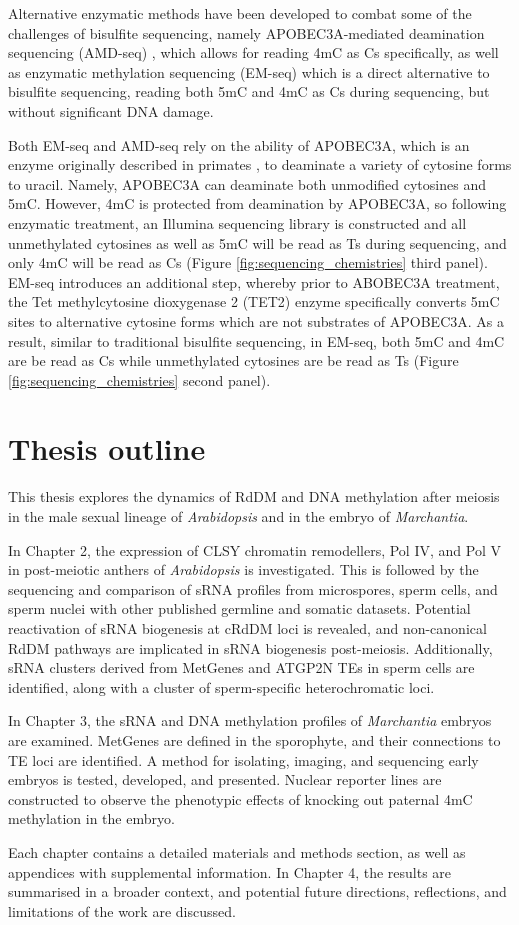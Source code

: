 Alternative enzymatic methods have been developed to combat some of the challenges of bisulfite sequencing, namely APOBEC3A-mediated deamination sequencing (AMD-seq) \cite{RN188}, which allows for reading 4mC as Cs specifically, as well as enzymatic methylation sequencing \cite{RN319} (EM-seq) which is a direct alternative to bisulfite sequencing, reading both 5mC and 4mC as Cs during sequencing, but without significant DNA damage.

Both EM-seq and AMD-seq rely on the ability of APOBEC3A, which is an enzyme originally described in primates \cite{RN320}, to deaminate a variety of cytosine forms to uracil. Namely, APOBEC3A can deaminate both unmodified cytosines and 5mC. However, 4mC is protected from deamination by APOBEC3A, so following enzymatic treatment, an Illumina sequencing library is constructed and all unmethylated cytosines as well as 5mC will be read as Ts during sequencing, and only 4mC will be read as Cs \cite{RN188} (Figure \ref{fig:sequencing_chemistries} third panel). EM-seq introduces an additional step, whereby prior to ABOBEC3A treatment, the Tet methylcytosine dioxygenase 2 (TET2) enzyme specifically converts 5mC sites to alternative cytosine forms which are not substrates of APOBEC3A. As a result, similar to traditional bisulfite sequencing, in EM-seq, both 5mC and 4mC are be read as Cs while unmethylated cytosines are be read as Ts (Figure \ref{fig:sequencing_chemistries} second panel).


\section{Thesis outline}

This thesis explores the dynamics of RdDM and DNA methylation after meiosis in the male sexual lineage of \textit{Arabidopsis} and in the embryo of \textit{Marchantia}.

In Chapter 2, the expression of CLSY chromatin remodellers, Pol IV, and Pol V in post-meiotic anthers of \textit{Arabidopsis} is investigated. This is followed by the sequencing and comparison of sRNA profiles from microspores, sperm cells, and sperm nuclei with other published germline and somatic datasets. Potential reactivation of sRNA biogenesis at cRdDM loci is revealed, and non-canonical RdDM pathways are implicated in sRNA biogenesis post-meiosis. Additionally, sRNA clusters derived from MetGenes and ATGP2N TEs in sperm cells are identified, along with a cluster of sperm-specific heterochromatic loci.

In Chapter 3, the sRNA and DNA methylation profiles of \textit{Marchantia} embryos are examined. MetGenes are defined in the sporophyte, and their connections to TE loci are identified. A method for isolating, imaging, and sequencing early embryos is tested, developed, and presented. Nuclear reporter lines are constructed to observe the phenotypic effects of knocking out paternal 4mC methylation in the embryo.

Each chapter contains a detailed materials and methods section, as well as appendices with supplemental information. In Chapter 4, the results are summarised in a broader context, and potential future directions, reflections, and limitations of the work are discussed.

